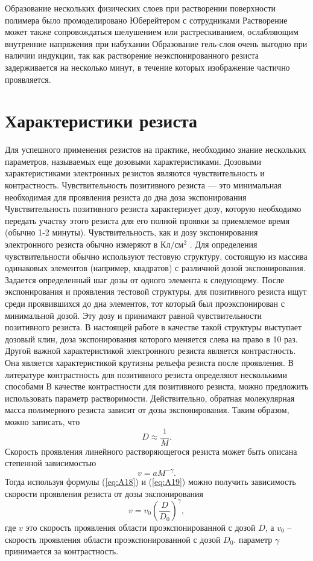 Образование нескольких физических
слоев при растворении поверхности полимера было промоделировано Юберейтером с сотрудниками Растворение может также сопровождаться шелушением или растрескиванием, ослабляющим внутренние напряжения при набухании Образование гель-слоя очень выгодно при наличии индукции, так как растворение неэкспонированного резиста задерживается на несколько минут, в течение которых изображение частично проявляется.

\section{Характеристики резиста}

Для успешного применения резистов на практике, необходимо знание нескольких параметров, называемых еще дозовыми характеристиками. Дозовыми характеристиками электронных резистов являются чувствительность и контрастность. Чувствительность позитивного резиста — это минимальная необходимая для проявления резиста до дна доза экспонирования Чувствительность позитивного резиста характеризует дозу, которую необходимо передать участку этого резиста для его полной проявки за приемлемое время (обычно 1-2 минуты). Чувствительность, как и дозу экспонирования электронного резиста обычно измеряют в $\text{Кл}/\text{см}^2$ . Для
определения чувствительности обычно используют тестовую структуру, состоящую из массива одинаковых элементов (например, квадратов) с
различной дозой экспонирования. Задается определенный шаг дозы от одного элемента к следующему. После экспонирования и проявления тестовой структуры, для позитивного резиста ищут среди проявившихся до дна элементов, тот который был проэкспонирован с минимальной дозой. Эту дозу и принимают равной чувствительности позитивного резиста. В настоящей работе в качестве такой структуры выступает дозовый клин, доза экспонирования которого меняется слева на право в 10 раз.
Другой важной характеристикой электронного резиста является контрастность. Она является характеристикой крутизны рельефа резиста после проявления. В литературе контрастность для позитивного резиста определяют несколькими способами	В качестве контрастности для
позитивного резиста, можно предложить использовать параметр растворимости. Действительно, обратная молекулярная масса полимерного резиста зависит от дозы экспонирования. 
Таким образом, можно записать, что
\begin{equation}
D\approx \frac{1}{M}.
\label{eq:A18}
\end{equation}
Скорость проявления линейного растворяющегося резиста может быть описана степенной зависимостью \cite{16,22,23}
\begin{equation}
v=aM^{-\gamma}.
\label{eq:A19}
\end{equation}
Тогда используя формулы (\ref{eq:A18}) и (\ref{eq:A19}) можно получить зависимость скорости проявления резиста от дозы экспонирования 
\begin{equation}
v=v_0\left(\frac{D}{D_0}\right)^\gamma,
\label{eq:A20}
\end{equation}
где $v$ это скорость проявления области проэкспонированной с дозой $D$, а $v_0$ -- скорость проявления области проэкспонированной с дозой $D_0$. параметр $\gamma$ принимается за контрастность. 
